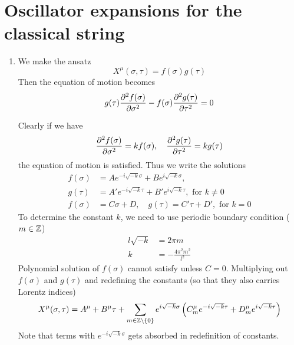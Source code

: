 \section{Oscillator expansions for the classical string}
\begin{enumerate}[label=(\alph*)]
	\item We make the ansatz
		\begin{equation}
			X^\mu (\sigma, \tau) = f(\sigma) g(\tau)
		\end{equation}
		Then the equation of motion becomes
		\begin{align*}
			g(\tau )\pdv[2]{f(\sigma)}{\sigma}- f(\sigma) \pdv[2]{g(\tau)}{\tau}  &= 0 \\
		\end{align*}
		
		Clearly if we have
		\begin{equation}
			\pdv[2]{f(\sigma)}{\sigma}  = k f(\sigma), \quad \pdv[2]{g(\tau)}{\tau} = k g(\tau)
		\end{equation}
		the equation of motion is satisfied. Thus we write the solutions
		\begin{align*}
			f(\sigma) &= A e^{-i \sqrt{-k} \sigma} + B e^{i\sqrt{-k}\sigma}, \\ 
			g(\tau) &= A' e^{-i \sqrt{-k} \tau} + B' e^{i\sqrt{-k}\tau}, \text{ for } k \neq 0 \\
			f(\sigma) &= C\sigma + D, \quad g(\tau) = C' \tau + D', \text{ for } k = 0
		\end{align*}
		To determine the constant $k$, we need to use periodic boundary condition ($m\in \mathbb{Z}$)
		\begin{align*}
			l \sqrt{-k} &= 2 \pi m  \\
			k &= - \frac{4 \pi^2 m^2}{l^2}
		\end{align*}
		Polynomial solution of $f(\sigma)$ cannot satisfy unless $C=0$. Multiplying out $f(\sigma)$ and $g(\tau)$ and redefining the constants (so that they also carries Lorentz indices)
		\begin{equation}
			X^\mu (\sigma, \tau) = A^\mu + B^\mu \tau + \sum_{m\in \mathbb{Z} \setminus \{0\}} e^{i\sqrt{-k}\sigma} \left( C^\mu_m e^{-i\sqrt{-k}\tau} + D^\mu_m e^{i\sqrt{-k}\tau} \right)
		\end{equation}	
		Note that terms with $e^{-i\sqrt{-k}\sigma}$ gets absorbed in redefinition of constants.


\end{enumerate}
